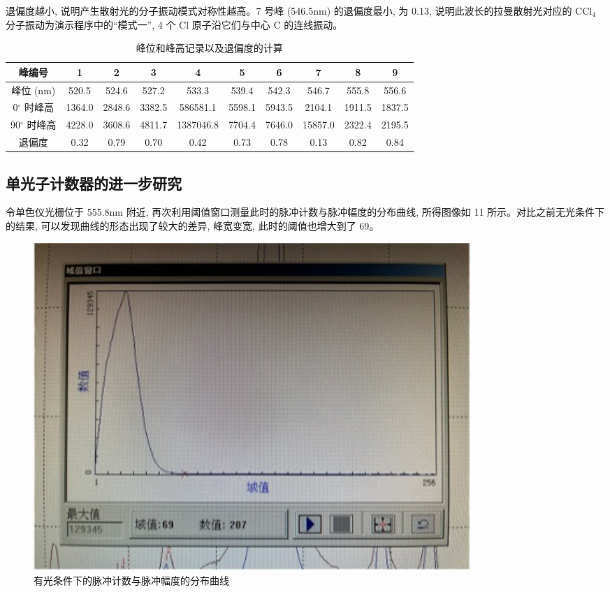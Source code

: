\documentclass{article}
\begin{document}
退偏度越小, 说明产生散射光的分子振动模式对称性越高。7 号峰 (546.5nm) 的退偏度最小, 为 0.13, 说明此波长的拉曼散射光对应的 CCl$_{4}$ 分子振动为演示程序中的“模式一”, 4 个 Cl 原子沿它们与中心 C 的连线振动。

\begin{table}[H]
    \centering
    \caption{峰位和峰高记录以及退偏度的计算}
    \begin{tabular}{cccccccccc}
        \toprule
        峰编号 & 1 & 2 & 3 & 4 & 5 & 6 & 7 & 8 & 9 \\
        \midrule
        峰位 (nm) & 520.5 & 524.6 & 527.2 & 533.3 & 539.4 & 542.3 & 546.7 & 555.8 & 556.6 \\
        0$^\circ$ 时峰高 & 1364.0 & 2848.6 & 3382.5 & 586581.1 & 5598.1 & 5943.5 & 2104.1 & 1911.5 & 1837.5 \\
        90$^\circ$ 时峰高 & 4228.0 & 3608.6 & 4811.7 & 1387046.8 & 7704.4 & 7646.0 & 15857.0 & 2322.4 & 2195.5 \\
        退偏度 & 0.32 & 0.79 & 0.70 & 0.42 & 0.73 & 0.78 & 0.13 & 0.82 & 0.84 \\
        \bottomrule
    \end{tabular}
    \label{tab:peak_values2}
\end{table}


\subsection{单光子计数器的进一步研究}

令单色仪光栅位于 555.8nm 附近, 再次利用阈值窗口测量此时的脉冲计数与脉冲幅度的分布曲线, 所得图像如 11 所示。对比之前无光条件下的结果, 可以发现曲线的形态出现了较大的差异, 峰宽变宽, 此时的阈值也增大到了 69。

\begin{figure}[H]
    \centering
     \includegraphics[width=0.8\textwidth]{图片 11.jpg} %
    \caption{有光条件下的脉冲计数与脉冲幅度的分布曲线}
    \label{fig:pmt_light_count}
\end{figure}
\end{document}

